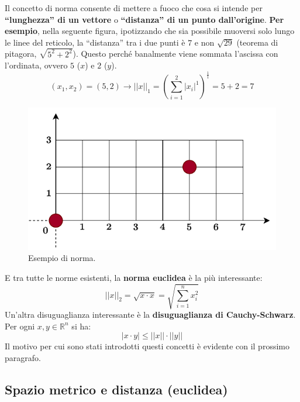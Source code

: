 \documentclass[a4paper]{article}
\newcommand{\dquotes}[1]{``#1''}
\newcommand{\example}[1]{\textcolor{Green4}{\textbf{#1}}}
\begin{document}
	\noindent
	Il concetto di norma consente di mettere a fuoco che cosa si intende per \textbf{\dquotes{lunghezza} di un vettore} o \textbf{\dquotes{distanza} di un punto dall'origine}. \example{Per esempio}, nella seguente figura, ipotizzando che sia possibile muoversi solo lungo le linee del reticolo, la \dquotes{distanza} tra i due punti è $7$ e non $\sqrt{29}$ (teorema di pitagora, $\sqrt{5^{2} + 2^{2}}$). Questo perché banalmente viene sommata l'ascissa con l'ordinata, ovvero $5$ ($x$) e $2$ ($y$).
	\begin{equation*}
		\left(x_{1},x_{2}\right) = \left(5,2\right) \longrightarrow \left|\left| x \right|\right|_{1} = \left(\sum_{i=1}^{2} \left| x_{i} \right|^{1}\right)^{\frac{1}{1}} = 5 + 2 = 7
	\end{equation*}
	\vspace{-2em}
	\begin{figure}[!htp]
		\centering
		\includegraphics[width=.6\textwidth]{img/norma.pdf}
		\caption{Esempio di norma.}
		\label{fig: esempio di norma}
	\end{figure}\newpage

	\noindent
	E tra tutte le norme esistenti, la \textbf{norma euclidea} è la più interessante:
	\begin{equation}\label{eq: norma euclidea}
		\left|\left| x \right|\right|_{2} = \sqrt{x \cdot x} = \sqrt{\displaystyle \sum_{i=1}^{n} x^{2}_{i}}
	\end{equation}
	Un'altra disuguaglianza interessante è la \textbf{disuguaglianza di Cauchy-Schwarz}. Per ogni $x,y \in \mathbb{R}^{n}$ si ha:
	\begin{equation}\label{eq: disuguaglianza di Cauchy-Schwarz}
		|x \cdot y| \le ||x|| \cdot ||y||
	\end{equation}
	Il motivo per cui sono stati introdotti questi concetti è evidente con il prossimo paragrafo.\newpage

	\subsection{Spazio metrico e distanza (euclidea)}\label{subsection: spazio metrico e distanza}
\end{document}
